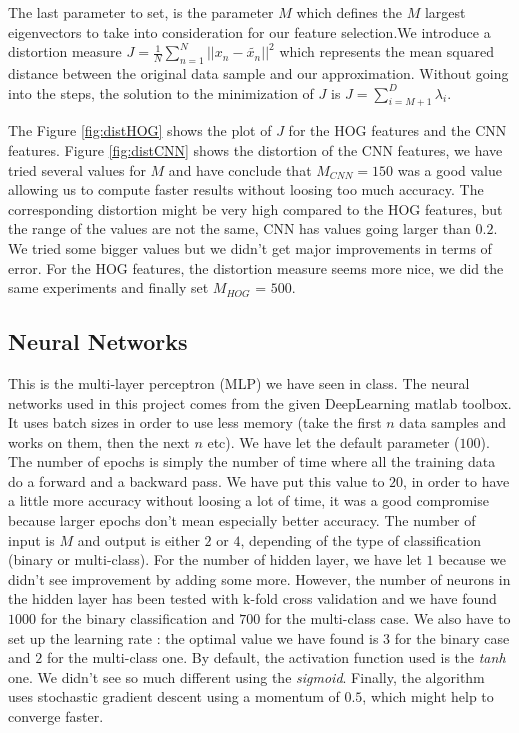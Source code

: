 \documentclass{article} %
\begin{document}
The last parameter to set, is the parameter $M$ which defines the $M$ largest eigenvectors to take into consideration for our feature selection.We introduce a distortion measure $J = \frac{1}{N}\sum_{n=1}^{N}||x_n-\tilde{x_n}||^2$ which represents the mean squared distance between the original data sample and our approximation. Without going into the steps, the solution to the minimization of $J$ is $J = \sum_{i=M+1}^D \lambda_i$. 


The Figure \ref{fig:distHOG} shows the plot of $J$ for the HOG features and the CNN features. Figure \ref{fig:distCNN} shows the distortion of the CNN features, we have tried several values for $M$ and have conclude that $M_{CNN} = 150$ was a good value allowing us to compute faster results without loosing too much accuracy. The corresponding distortion might be very high compared to the HOG features, but the range of the values are not the same, CNN has values going larger than $0.2$. We tried some bigger values but we didn't get major improvements in terms of error. For the HOG features, the distortion measure seems more nice, we did the same experiments and finally set $M_{HOG}$ = $500$. 

\subsection{Neural Networks}

This is the multi-layer perceptron (MLP) we have seen in class. The neural networks used in this project comes from the given DeepLearning matlab toolbox. It uses batch sizes in order to use less memory (take the first $n$ data samples and works on them, then the next $n$ etc). We have let the default parameter ($100$). The number of epochs is simply the number of time where all the training data do a forward and a backward pass. We have put this value to $20$, in order to have a little more accuracy without loosing a lot of time, it was a good compromise because larger epochs don't mean especially better accuracy. The number of input is $M$ and output is either $2$ or $4$, depending of the type of classification (binary or multi-class). For the number of hidden layer, we have let $1$ because we didn't see improvement by adding some more. However, the number of neurons in the hidden layer has been tested with k-fold cross validation and we have found $1000$ for the binary classification and $700$ for the multi-class case. We also have to set up the learning rate : the optimal value we have found is $3$ for the binary case and $2$ for the multi-class one. By default, the activation function used is the \textit{tanh} one. We didn't see so much different using the \textit{sigmoid}. Finally, the algorithm uses stochastic gradient descent using a momentum of $0.5$, which might help to converge faster.
\end{document}
